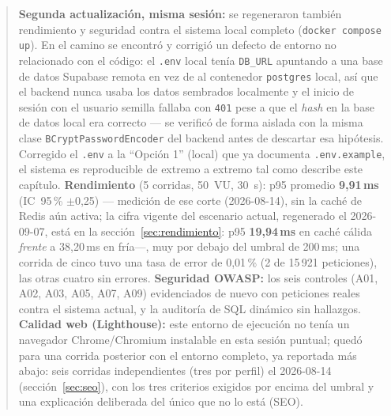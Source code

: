 \documentclass[11pt,a4paper]{article}
\newcommand{\ruta}[1]{\texttt{\footnotesize #1}}
\begin{document}
\begin{quote}
\textbf{Segunda actualización, misma sesión:} se regeneraron también
rendimiento y seguridad contra el sistema local completo
(\texttt{docker compose up}). En el camino se encontró y corrigió un
defecto de entorno no relacionado con el código: el \ruta{.env} local
tenía \texttt{DB\_URL} apuntando a una base de datos Supabase remota en
vez de al contenedor \texttt{postgres} local, así que el backend nunca
usaba los datos sembrados localmente y el inicio de sesión con el
usuario semilla fallaba con \texttt{401} pese a que el \emph{hash} en la
base de datos local era correcto — se verificó de forma aislada con la
misma clase \texttt{BCryptPasswordEncoder} del backend antes de
descartar esa hipótesis. Corregido el \ruta{.env} a la ``Opción 1''
(local) que ya documenta \ruta{.env.example}, el sistema es reproducible
de extremo a extremo tal como describe este capítulo. \textbf{Rendimiento}
(5 corridas, 50~VU, 30~s): p95 promedio \textbf{9,91\,ms} (IC~95\,\%
$\pm$0,25) — medición de ese corte (2026-08-14), sin la caché de Redis
aún activa; la cifra vigente del escenario actual, regenerado el
2026-09-07, está en la sección~\ref{sec:rendimiento}: p95 \textbf{19,94\,ms}
en caché cálida \emph{frente} a 38,20\,ms en fría—, muy por debajo del umbral de 200\,ms; una corrida de cinco
tuvo una tasa de error de 0,01\,\% (2 de 15\,921 peticiones), las otras
cuatro sin errores. \textbf{Seguridad OWASP:} los seis controles
(A01, A02, A03, A05, A07, A09) evidenciados de nuevo con peticiones
reales contra el sistema actual, y la auditoría de SQL dinámico sin
hallazgos. \textbf{Calidad web (Lighthouse):} este entorno de ejecución
no tenía un navegador Chrome/Chromium instalable en esta sesión puntual;
quedó para una corrida posterior con el entorno completo, ya reportada
más abajo: seis corridas independientes (tres por perfil) el 2026-08-14
(sección~\ref{sec:seo}), con los tres criterios exigidos por encima del
umbral y una explicación deliberada del único que no lo está (SEO).


\end{quote}
\end{document}
